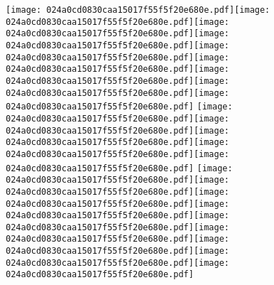 \documentclass{article}
\newcommand{\origpg}[2]{\texttt{[image: 024a0cd0830caa15017f55f5f20e680e.pdf]}}
\begin{document}
{\vspace{19.995pt}\origpg4{85.303pt 229.65pt 93.373pt 245.79pt}\hspace{-0.113pt}\origpg4{93.26pt 229.65pt 101.89pt 245.79pt}\origpg4{101.89pt 229.65pt 110.53pt 245.79pt}\origpg4{110.59pt 229.65pt 117.76pt 245.79pt}\origpg4{117.81pt 229.65pt 128.66pt 245.79pt}\origpg4{128.66pt 229.65pt 136.27pt 245.79pt}\hspace{-0.403pt}\origpg4{135.87pt 229.65pt 143.04pt 245.79pt}\hspace{-0.42pt}\origpg4{142.62pt 229.65pt 149.67pt 245.79pt}\origpg4{149.61pt 229.65pt 156.97pt 245.79pt} \hspace{17.721pt}\origpg4{178.82pt 229.65pt 185.87pt 245.79pt}\hspace{0.161pt}\origpg4{186.03pt 229.65pt 193.2pt 245.79pt}\hspace{-0.178pt}\origpg4{193.02pt 229.65pt 200.87pt 245.79pt}\hspace{-0.613pt}\origpg4{200.25pt 229.65pt 208.32pt 245.79pt}\origpg4{208.42pt 229.65pt 215.59pt 245.79pt} \hspace{17.703pt}\origpg4{237.15pt 229.65pt 245.78pt 245.79pt}\origpg4{245.78pt 229.65pt 253.85pt 245.79pt}\hspace{-0.323pt}\origpg4{253.53pt 229.65pt 261.15pt 245.79pt}\origpg4{261.23pt 229.65pt 268.39pt 245.79pt}\hspace{-0.42pt}\origpg4{267.97pt 229.65pt 276.19pt 245.79pt}\origpg4{276.19pt 229.65pt 283.36pt 245.79pt}\hspace{-0.21pt}\origpg4{283.15pt 229.65pt 291.78pt 245.79pt}\origpg4{291.78pt 229.65pt 300.42pt 245.79pt}\origpg4{300.48pt 229.65pt 307.65pt 245.79pt} 

}
\end{document}
